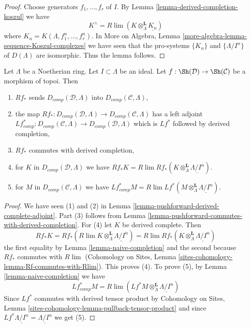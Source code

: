 \begin{proof}
Choose generators $f_1, \ldots, f_r$ of $I$. By
Lemma \ref{lemma-derived-completion-koszul} we have
$$
K^\wedge = 
R\lim (K \otimes_\Lambda^\mathbf{L} \underline{K_n})
$$
where $K_n = K(\Lambda, f_1^n, \ldots, f_r^n)$.
In More on Algebra, Lemma \ref{more-algebra-lemma-sequence-Koszul-complexes}
we have seen that the pro-systems $\{K_n\}$ and
$\{\Lambda/I^n\}$ of $D(\Lambda)$
are isomorphic. Thus the lemma follows.
\end{proof}

\begin{lemma}
\label{lemma-pushforward-Noetherian-case}
Let $\Lambda$ be a Noetherian ring. Let $I \subset \Lambda$ be an ideal.
Let $f : \Sh(\mathcal{D}) \to \Sh(\mathcal{C})$ be a morphism of topoi.
Then
\begin{enumerate}
\item $Rf_*$ sends $D_{comp}(\mathcal{D}, \Lambda)$
into $D_{comp}(\mathcal{C}, \Lambda)$,
\item the map $Rf_* : D_{comp}(\mathcal{D}, \Lambda) \to
D_{comp}(\mathcal{C}, \Lambda)$ has a left adjoint
$Lf_{comp}^* : D_{comp}(\mathcal{C}, \Lambda) \to
D_{comp}(\mathcal{D}, \Lambda)$ which is $Lf^*$ followed by
derived completion,
\item $Rf_*$ commutes with derived completion,
\item for $K$ in $D_{comp}(\mathcal{D}, \Lambda)$ we have
$Rf_*K = R\lim Rf_*(K \otimes^\mathbf{L}_\Lambda \underline{\Lambda/I^n})$.
\item for $M$ in $D_{comp}(\mathcal{C}, \Lambda)$ we have
$Lf^*_{comp}M =
R\lim Lf^*(M \otimes^\mathbf{L}_\Lambda \underline{\Lambda/I^n})$.
\end{enumerate}
\end{lemma}

\begin{proof}
We have seen (1) and (2) in
Lemma \ref{lemma-pushforward-derived-complete-adjoint}.
Part (3) follows from
Lemma \ref{lemma-pushforward-commutes-with-derived-completion}.
For (4) let $K$ be derived complete. Then
$$
Rf_*K = Rf_*( R\lim K \otimes^\mathbf{L}_\Lambda \underline{\Lambda/I^n}) =
R\lim Rf_*(K \otimes^\mathbf{L}_\Lambda \underline{\Lambda/I^n})
$$
the first equality by Lemma \ref{lemma-naive-completion}
and the second because $Rf_*$ commutes with $R\lim$
(Cohomology on Sites, Lemma
\ref{sites-cohomology-lemma-Rf-commutes-with-Rlim}). This proves (4).
To prove (5), by Lemma \ref{lemma-naive-completion} we have
$$
Lf_{comp}^*M =
R\lim ( Lf^*M \otimes_\Lambda^\mathbf{L} \underline{\Lambda/I^n})
$$
Since $Lf^*$ commutes with derived tensor product by
Cohomology on Sites, Lemma \ref{sites-cohomology-lemma-pullback-tensor-product}
and since $Lf^*\underline{\Lambda/I^n} = \underline{\Lambda/I^n}$
we get (5).
\end{proof}







